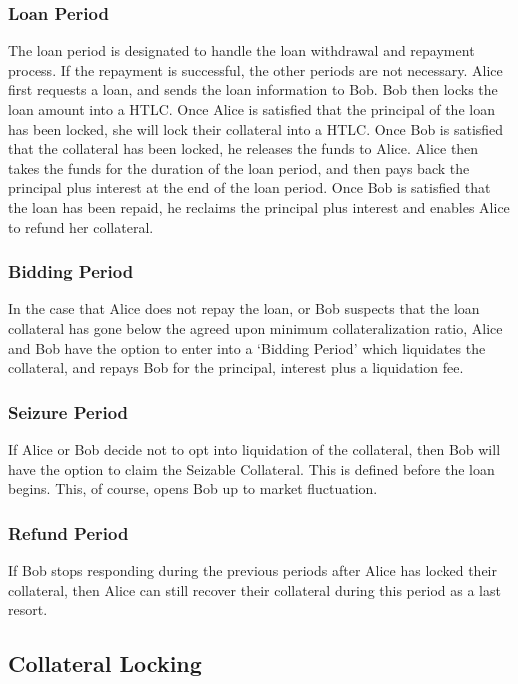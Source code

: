 \documentclass{llncs}
\begin{document}
\subsubsection{Loan Period}

The loan period is designated to handle the loan withdrawal and repayment process. If the repayment is successful, the other periods are not necessary. Alice first requests a loan, and sends the loan information to Bob. Bob then locks the loan amount into a HTLC. Once Alice is satisfied that the principal of the loan has been locked, she will lock their collateral into a HTLC. Once Bob is satisfied that the collateral has been locked, he releases the funds to Alice. Alice then takes the funds for the duration of the loan period, and then pays back the principal plus interest at the end of the loan period. Once Bob is satisfied that the loan has been repaid, he reclaims the principal plus interest and enables Alice to refund her collateral.  

\subsubsection{Bidding Period}
In the case that Alice does not repay the loan, or Bob suspects that the loan collateral has gone below the agreed upon minimum collateralization ratio, Alice and Bob have the option to enter into a `Bidding Period' which liquidates the collateral, and repays Bob for the principal, interest plus a liquidation fee. 

\subsubsection{Seizure Period}
If Alice or Bob decide not to opt into liquidation of the collateral, then Bob will have the option to claim the Seizable Collateral. This is defined before the loan begins. This, of course, opens Bob up to market fluctuation. 

\subsubsection{Refund Period}
If Bob stops responding during the previous periods after Alice has locked their collateral, then Alice can still recover their collateral during this period as a last resort. 

\subsection{Collateral Locking} \label{ssec:4:3}
\end{document}
